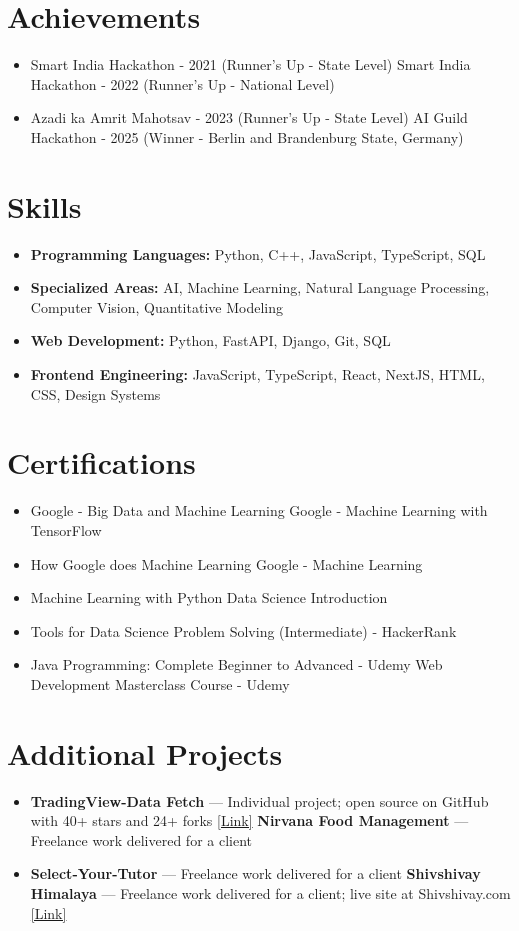 \documentclass[a4paper,10pt]{article}
\begin{document}
\section*{Achievements}
\begin{itemize}
\item Smart India Hackathon - 2021 (Runner's Up - State Level) \hfill Smart India Hackathon - 2022 (Runner's Up - National Level)
\item Azadi ka Amrit Mahotsav - 2023 (Runner's Up - State Level) \hfill AI Guild Hackathon - 2025 (Winner - Berlin and Brandenburg State, Germany)
\end{itemize}

\section*{Skills}
\begin{itemize}
  \item \textbf{Programming Languages:} Python, C++, JavaScript, TypeScript, SQL
  \item \textbf{Specialized Areas:} AI, Machine Learning, Natural Language Processing, Computer Vision, Quantitative Modeling
  \item \textbf{Web Development:} Python, FastAPI, Django, Git, SQL
  \item \textbf{Frontend Engineering:} JavaScript, TypeScript, React, NextJS, HTML, CSS, Design Systems
\end{itemize}

\section*{Certifications}
\begin{itemize}
\item Google - Big Data and Machine Learning \hfill Google - Machine Learning with TensorFlow
\item How Google does Machine Learning \hfill Google - Machine Learning
\item Machine Learning with Python \hfill Data Science Introduction
\item Tools for Data Science \hfill Problem Solving (Intermediate) - HackerRank
\item Java Programming: Complete Beginner to Advanced - Udemy \hfill Web Development Masterclass Course - Udemy
\end{itemize}

\section*{Additional Projects}
\begin{itemize}
\item \textbf{TradingView-Data Fetch} — Individual project; open source on GitHub with 40+ stars and 24+ forks \href{https://github.com/ravalmeet/TradingView}{[Link]} \hfill \textbf{Nirvana Food Management} — Freelance work delivered for a client
\item \textbf{Select-Your-Tutor} — Freelance work delivered for a client \hfill \textbf{Shivshivay Himalaya} — Freelance work delivered for a client; live site at Shivshivay.com \href{Shivshivay.com}{[Link]}
\end{itemize}
\end{document}
